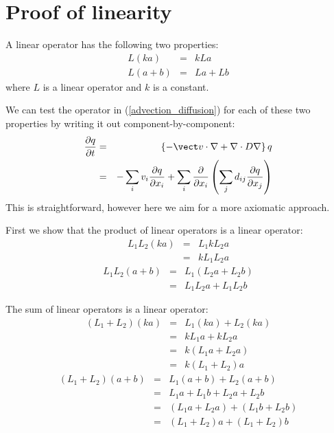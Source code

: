 
\section{Proof of linearity}

\label{linearity}


A linear operator has the following two properties:
\begin{eqnarray}
	L(ka) & = & kLa \\
	L(a+b) & = & La + Lb
\end{eqnarray}
where $L$ is a linear operator and $k$ is a constant.

We can test the operator in (\ref{advection_diffusion}) for each of these two
properties by writing it out component-by-component:
\begin{eqnarray}
	\frac{\partial q}{\partial t} & = & \left \lbrace -\vect v \cdot \nabla + \nabla \cdot D \nabla \right \rbrace q \\
				   & = & - \sum_i v_i \frac{\partial q}{\partial x_i} + \sum_i \frac{\partial}{\partial x_i} \left ( \sum_j d_{ij} \frac{\partial q}{\partial x_j} \right )
\end{eqnarray}
This is straightforward, however here we aim for a more axiomatic approach.

First we show that the product of linear operators is a linear operator:
\begin{eqnarray}
	L_1 L_2 (ka) & = & L_1 k L_2 a \\
		    & = & k L_1 L_2 a
\end{eqnarray}
\begin{eqnarray}
	L_1 L_2 (a+b) & = & L_1 (L_2 a + L_2 b) \\
		    & = & L_1 L_2 a + L_1 L_2 b
\end{eqnarray}

The sum of linear operators is a linear operator:
\begin{eqnarray}
	(L_1 + L_2) (ka) & = & L_1 (ka) + L_2 (ka) \\
		    & = & k L_1 a + k L_2 a \\
	     & = & k (L_1 a + L_2 a) \\
	     & = & k (L_1 + L_2) a
\end{eqnarray}
\begin{eqnarray}
	(L_1 + L_2) (a + b) & = & L_1 (a + b) + L_2 (a + b) \\
		    & = & L_1 a + L_1 b + L_2 a + L_2 b \\
	     & = & (L_1 a + L_2 a) + (L_1 b + L_2 b) \\
	     & = & (L_1 + L_2) a + (L_1 + L_2) b
\end{eqnarray}

